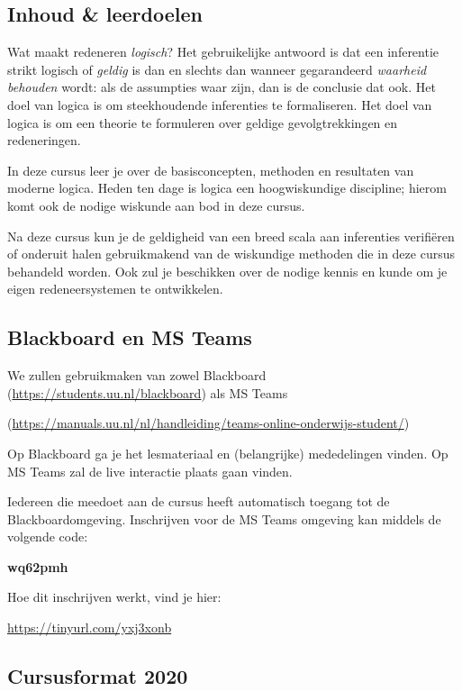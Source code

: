 \subsection*{Inhoud \& leerdoelen}

Wat maakt redeneren \emph{logisch}?
Het gebruikelijke antwoord is dat een inferentie strikt logisch of \emph{geldig} is dan en slechts dan wanneer gegarandeerd \emph{waarheid behouden} wordt: als de assumpties waar zijn, dan is de conclusie dat ook.
Het doel van logica is om steekhoudende inferenties te formaliseren.
Het doel van logica is om een theorie te formuleren over geldige gevolgtrekkingen en redeneringen. 

In deze cursus leer je over de basisconcepten, methoden en resultaten van moderne logica.
Heden ten dage is logica een hoogwiskundige discipline; hierom komt ook de nodige wiskunde aan bod in deze cursus.

Na deze cursus kun je de geldigheid van een breed scala aan inferenties verifiëren of onderuit halen gebruikmakend van de wiskundige methoden die in deze cursus behandeld worden.
Ook zul je beschikken over de nodige kennis en kunde om je eigen redeneersystemen te ontwikkelen.

\subsection*{Blackboard en MS Teams}
\label{sec:ms-teams}

We zullen gebruikmaken van zowel Blackboard (\url{https://students.uu.nl/blackboard}) als MS Teams \begin{center}
(\url{https://manuals.uu.nl/nl/handleiding/teams-online-onderwijs-student/})
\end{center}

Op Blackboard ga je het lesmateriaal en (belangrijke) mededelingen vinden.
Op MS Teams zal de live interactie plaats gaan vinden.

Iedereen die meedoet aan de cursus heeft automatisch toegang tot de Blackboardomgeving.
Inschrijven voor de MS Teams omgeving kan middels de volgende code:
\begin{center}
  \textbf{wq62pmh}
\end{center}
Hoe dit inschrijven werkt, vind je hier:
\begin{center}
  \url{https://tinyurl.com/yxj3xonb}
\end{center}

\subsection*{Cursusformat 2020}

